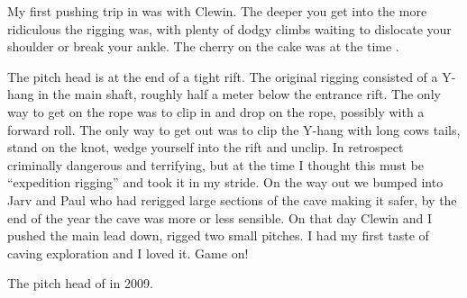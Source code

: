 

My first pushing trip in  was with Clewin. The
deeper you get into  the more ridiculous the
rigging was, with plenty of dodgy climbs waiting to dislocate your
shoulder or break your ankle. The cherry on the cake was at the time
.

The pitch head is at the end of a tight rift. The original rigging
consisted of a Y-hang in the main shaft, roughly half a meter below the
entrance rift. The only way to get on the rope was to clip in and drop
on the rope, possibly with a forward roll. The only way to get out was
to clip the Y-hang with long cows tails, stand on the knot, wedge
yourself into the rift and unclip. In retrospect criminally dangerous
and terrifying, but at the time I thought this must be ``expedition
rigging'' and took it in my stride. On the way out we bumped into Jarv
and Paul who had rerigged large sections of the cave making it safer, by
the end of the year the cave was more or less sensible. On that day
Clewin and I pushed the main lead down, rigged two small pitches. I had
my first taste of caving exploration and I loved it. Game on!

\begin{marginfigure}
\checkoddpage \ifoddpage \forcerectofloat \else \forceversofloat \fi
\centering
 \caption{The pitch head of \protect{} in 2009. }
 \label{Kill em all wellies}
\end{marginfigure}

